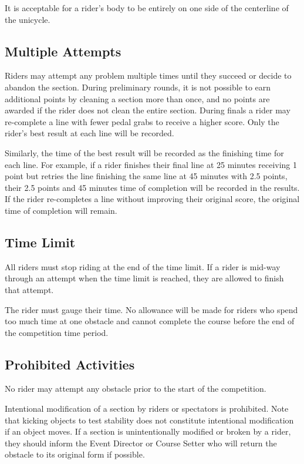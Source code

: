 It is acceptable for a rider's body to be entirely on one side of the centerline of the unicycle.

\subsection{Multiple Attempts}
Riders may attempt any problem multiple times until they succeed or decide to abandon the section.
During preliminary rounds, it is not possible to earn additional points by cleaning a section more than once, and no points are awarded if the rider does not clean the entire section.
During finals a rider may re-complete a line with fewer pedal grabs to receive a higher score.
Only the rider's best result at each line will be recorded.

Similarly, the time of the best result will be recorded as the finishing time for each line.
For example, if a rider finishes their final line at 25 minutes receiving 1 point but retries the line finishing the same line at 45 minutes with 2.5 points, their 2.5 points and 45 minutes time of completion will be recorded in the results.
If the rider re-completes a line without improving their original score, the original time of completion will remain.

\subsection{Time Limit}

All riders must stop riding at the end of the time limit.
If a rider is mid-way through an attempt when the time limit is reached, they are allowed to finish that attempt.

The rider must gauge their time.
No allowance will be made for riders who spend too much time at one obstacle and cannot complete the course before the end of the competition time period.

\subsection{Prohibited Activities}
No rider may attempt any obstacle prior to the start of the competition.

Intentional modification of a section by riders or spectators is prohibited.
Note that kicking objects to test stability does not constitute intentional modification if an object moves.
If a section is unintentionally modified or broken by a rider, they should inform the Event Director or Course Setter who will return the obstacle to its original form if possible.%
